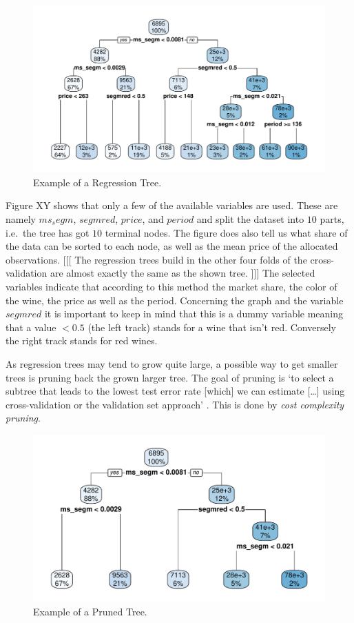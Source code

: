 \documentclass[11pt,]{article}
\begin{document}
\begin{figure}
\centering
\includegraphics{../00_data/output_paper/09_tree.pdf}
\caption{Example of a Regression Tree.}
\end{figure}

Figure XY shows that only a few of the available variables are used.
These are namely \(ms_segm\), \(segmred\), \(price\), and \(period\) and
split the dataset into \(10\) parts, i.e.~the tree has got \(10\)
terminal nodes. The figure does also tell us what share of the data can
be sorted to each node, as well as the mean price of the allocated
observations. {[}{[}{[} The regression trees build in the other four
folds of the cross-validation are almost exactly the same as the shown
tree. {]}{]}{]} The selected variables indicate that according to this
method the market share, the color of the wine, the price as well as the
period. Concerning the graph and the variable \(segmred\) it is
important to keep in mind that this is a dummy variable meaning that a
value \(< 0.5\) (the left track) stands for a wine that isn't red.
Conversely the right track stands for red wines.

As regression trees may tend to grow quite large, a possible way to get
smaller trees is pruning back the grown larger tree. The goal of pruning
is `to select a subtree that leads to the lowest test error rate {[}which{]} we can estimate {[}\ldots{}{]} using cross-validation or the
validation set approach' \autocite[p.~308]{James2014}. This is done by
\emph{cost complexity pruning}.

\begin{figure}
\centering
\includegraphics{../00_data/output_paper/09_tree_pruned.pdf}
\caption{Example of a Pruned Tree.}
\end{figure}
\end{document}
